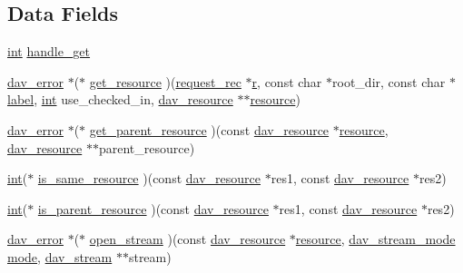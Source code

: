 \subsection*{Data Fields}
\begin{DoxyCompactItemize}
\item 
\hyperlink{pcre_8txt_a42dfa4ff673c82d8efe7144098fbc198}{int} \hyperlink{structdav__hooks__repository_af1902b90a25b249a0269f414086905d4}{handle\+\_\+get}
\item 
\hyperlink{structdav__error}{dav\+\_\+error} $\ast$($\ast$ \hyperlink{structdav__hooks__repository_ac2cd520aaf04f5dd518a9da60ba910c5}{get\+\_\+resource} )(\hyperlink{structrequest__rec}{request\+\_\+rec} $\ast$\hyperlink{pcregrep_8txt_a2e9e9438b26c0bb4425367a7e4f75eb3}{r}, const char $\ast$root\+\_\+dir, const char $\ast$\hyperlink{pcregrep_8txt_ad072e9f95bffc33f26ec2d611742f819}{label}, \hyperlink{pcre_8txt_a42dfa4ff673c82d8efe7144098fbc198}{int} use\+\_\+checked\+\_\+in, \hyperlink{structdav__resource}{dav\+\_\+resource} $\ast$$\ast$\hyperlink{group__APR__Util__RL_gaa6244aacafcc4ec1d0727bdb32614b11}{resource})
\item 
\hyperlink{structdav__error}{dav\+\_\+error} $\ast$($\ast$ \hyperlink{structdav__hooks__repository_a3fdd98302c661567875db6d456ecdfe5}{get\+\_\+parent\+\_\+resource} )(const \hyperlink{structdav__resource}{dav\+\_\+resource} $\ast$\hyperlink{group__APR__Util__RL_gaa6244aacafcc4ec1d0727bdb32614b11}{resource}, \hyperlink{structdav__resource}{dav\+\_\+resource} $\ast$$\ast$parent\+\_\+resource)
\item 
\hyperlink{pcre_8txt_a42dfa4ff673c82d8efe7144098fbc198}{int}($\ast$ \hyperlink{structdav__hooks__repository_a51921908d30c5395f6a418c3fc6df08a}{is\+\_\+same\+\_\+resource} )(const \hyperlink{structdav__resource}{dav\+\_\+resource} $\ast$res1, const \hyperlink{structdav__resource}{dav\+\_\+resource} $\ast$res2)
\item 
\hyperlink{pcre_8txt_a42dfa4ff673c82d8efe7144098fbc198}{int}($\ast$ \hyperlink{structdav__hooks__repository_aa016cf206d17430843b7d847723001a3}{is\+\_\+parent\+\_\+resource} )(const \hyperlink{structdav__resource}{dav\+\_\+resource} $\ast$res1, const \hyperlink{structdav__resource}{dav\+\_\+resource} $\ast$res2)
\item 
\hyperlink{structdav__error}{dav\+\_\+error} $\ast$($\ast$ \hyperlink{structdav__hooks__repository_aef60be7356bf83753891da839d96c1ae}{open\+\_\+stream} )(const \hyperlink{structdav__resource}{dav\+\_\+resource} $\ast$\hyperlink{group__APR__Util__RL_gaa6244aacafcc4ec1d0727bdb32614b11}{resource}, \hyperlink{group__MOD__DAV_gaa9b8fd424c6f34394f12b0278bdc747b}{dav\+\_\+stream\+\_\+mode} \hyperlink{pcregrep_8txt_ad194431669b7d1f96d2dacfb7be21261}{mode}, \hyperlink{structdav__stream}{dav\+\_\+stream} $\ast$$\ast$stream)
$$
\end{DoxyCompactItemize}
